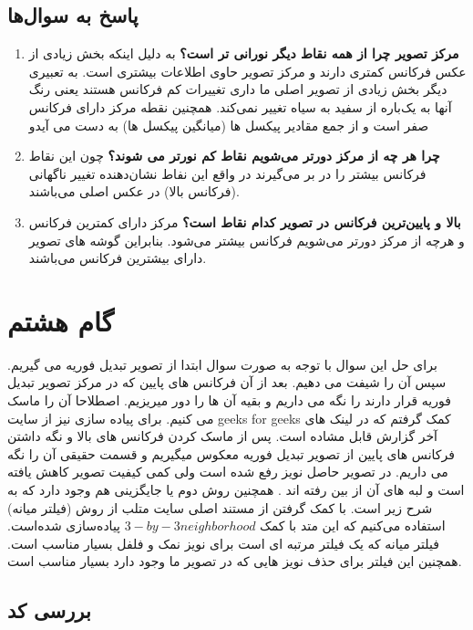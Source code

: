 \subsection{پاسخ به سوال‌ها}
\begin{enumerate}
    \item \textbf{مرکز تصویر چرا از همه نقاط دیگر نورانی تر است؟}
    به دلیل اینکه بخش زیادی از عکس فرکانس کمتری دارند و مرکز تصویر حاوی اطلاعات بیشتری است.
    به تعبیری دیگر بخش زیادی از تصویر اصلی ما داری تغییرات کم فرکانس هستند یعنی رنگ آنها به یک‌باره از سفید به سیاه تغییر نمی‌کند.
    همچنین نقطه مرکز دارای فرکانس صفر است و  از جمع مقادیر پیکسل ها (میانگین پیکسل ها) به دست می آیدو
    \item \textbf{چرا هر چه از مرکز دورتر می‌شویم نقاط کم نورتر می شوند؟}
    چون این نقاط فرکانس بیشتر را در بر می‌گیرند در واقع این نفاط نشان‌دهنده تغییر ناگهانی
    (فرکانس بالا)
    در عکس اصلی می‌باشند.
    \item \textbf{بالا و پایین‌ترین فرکانس در تصویر کدام نقاط است؟}
    مرکز دارای کمترین فرکانس و هرچه از مرکز دورتر می‌شویم فرکانس بیشتر می‌شود.
    بنابراین گوشه های تصویر دارای بیشترین فرکانس می‌باشند.
\end{enumerate}
\section{گام هشتم}
برای حل این سوال با توجه به صورت سوال ابتدا از تصویر تبدیل فوریه می گیریم.
سپس آن را شیفت می دهیم. بعد از آن فرکانس های پایین که در مرکز تصویر تبدیل فوریه قرار دارند را نگه می داریم و بقیه آن ها را دور میریزیم.
اصطلاحا آن را ماسک می کنیم. برای پیاده سازی نیز از سایت 
geeks for geeks
کمک گرفتم که در لینک های آخر گزارش قابل مشاده است.
پس از ماسک کردن فرکانس های بالا و نگه داشتن فرکانس های پایین از تصویر 
تبدیل فوریه معکوس میگیریم و قسمت حقیقی آن را نگه می داریم.
در تصویر حاصل نویز رفع شده است ولی کمی کیفیت تصویر کاهش یافته است و لبه های آن از بین رفته اند .
\BlankLine
همچنین روش دوم یا جایگزینی هم وجود دارد که به شرح زیر است.
با کمک گرفتن از مستند اصلی سایت متلب از روش 
(فیلتر میانه)
استفاده می‌کنیم که این متد با کمک
\(3-by-3 neighborhood\)
پیاده‌سازی شده‌است.
فیلتر میانه که یک فیلتر مرتبه ای است برای نویز نمک و فلفل بسیار مناسب است.
همچنین این فیلتر برای حذف نویز هایی که در تصویر ما وجود دارد بسیار مناسب است.
\subsection{بررسی کد}
\lr{}

